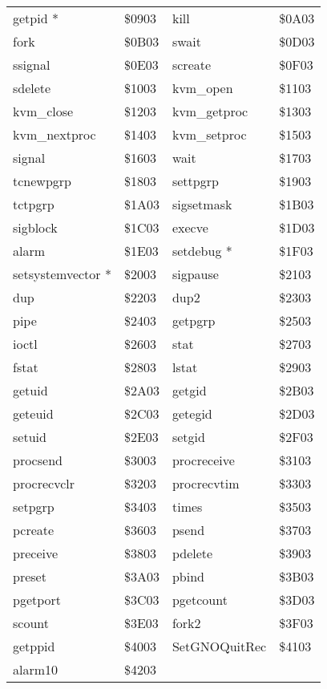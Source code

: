 \documentclass{report}
\begin{document}
\begin{tabular}{llll}
	getpid *		& \$0903	&
	kill			& \$0A03	\\
	fork			& \$0B03	&
	swait			& \$0D03	\\
	ssignal			& \$0E03	&
	screate			& \$0F03	\\
	sdelete			& \$1003	&
	kvm\_{}open		& \$1103	\\
	kvm\_{}close		& \$1203	&
	kvm\_{}getproc		& \$1303	\\
	kvm\_{}nextproc		& \$1403	&
	kvm\_{}setproc		& \$1503	\\
	signal			& \$1603	&
	wait			& \$1703	\\
	tcnewpgrp		& \$1803	&
	settpgrp		& \$1903	\\
	tctpgrp			& \$1A03	&
	sigsetmask		& \$1B03	\\
	sigblock		& \$1C03	&
	execve			& \$1D03	\\
	alarm			& \$1E03	&
	setdebug *		& \$1F03	\\
	setsystemvector *	& \$2003	&
	sigpause		& \$2103	\\
	dup			& \$2203	&
	dup2			& \$2303	\\
	pipe			& \$2403	&
	getpgrp			& \$2503	\\
	ioctl			& \$2603	&
	stat			& \$2703	\\
	fstat			& \$2803	&
	lstat			& \$2903	\\
	getuid			& \$2A03	&
	getgid			& \$2B03	\\
	geteuid			& \$2C03	&
	getegid			& \$2D03	\\
	setuid			& \$2E03	&
	setgid			& \$2F03	\\
	procsend		& \$3003	&
	procreceive		& \$3103	\\
	procrecvclr		& \$3203	&
	procrecvtim		& \$3303	\\
	setpgrp			& \$3403	&
	times			& \$3503	\\
	pcreate			& \$3603	&
	psend			& \$3703	\\
	preceive		& \$3803	&
	pdelete			& \$3903	\\
	preset			& \$3A03	&
	pbind			& \$3B03	\\
	pgetport		& \$3C03	&
	pgetcount		& \$3D03	\\
	scount			& \$3E03	&
	fork2			& \$3F03	\\
	getppid			& \$4003	&
	SetGNOQuitRec		& \$4103	\\
	alarm10			& \$4203	\\
\end{tabular}
\end{document}
